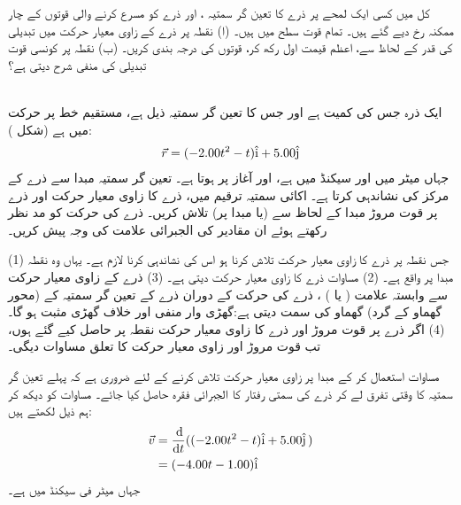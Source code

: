 کل  میں کسی ایک لمحے پر   ذرے کا تعین گر سمتیہ ، اور  ذرے کو مسرع کرنے والی قوتوں کے چار ممکنہ رخ دیے گئے ہیں۔ تمام قوت سطح  میں ہیں۔ (ا)  نقطہ  پر ذرے کے زاوی معیار حرکت میں تبدیلی   کی قدر  کے لحاظ سے، اعظم قیمت  اول رکھ کر،  قوتوں کی درجہ بندی کریں۔ (ب)  نقطہ  پر کونسی قوت  تبدیلی کی منفی شرح دیتی ہے؟

\\
ایک ذرہ جس کی کمیت     ہے اور جس کا تعین گر سمتیہ ذیل ہے، مستقیم خط پر حرکت میں ہے (شکل ):
\begin{align*}
\vec{r}=(-2.00t^2-t) \hat{\textup{i}}+5.00\hat{\textup{j}}
\end{align*}
جہاں  میٹر میں اور  سیکنڈ میں ہے، اور آغاز  پر ہوتا ہے۔ تعین گر سمتیہ مبدا سے ذرے  کے مرکز  کی نشاندہی کرتا ہے۔ اکائی سمتیہ ترقیم میں،  ذرے کا  زاوی معیار حرکت  اور  ذرے پر قوت مروڑ   مبدا کے لحاظ سے  (یا مبدا پر) تلاش کریں۔ ذرے کی حرکت کو مد نظر رکھتے ہوئے ان مقادیر کی الجبرائی علامت  کی وجہ پیش کریں۔

(1)  جس نقطہ پر ذرے کا زاوی معیار حرکت  تلاش کرنا ہو اس کی نشاندہی کرنا لازم ہے۔ یہاں وہ نقطہ مبدا پر واقع ہے۔ (2)   مساوات    ذرے کا زاوی معیار حرکت     دیتی ہے۔  (3)  ذرے کے زاوی معیار حرکت سے  وابستہ  علامت ( یا ) ، ذرے کی حرکت کے دوران ذرے کے تعین گر سمتیہ کے (محور گھماو کے گرد)   گھماو کی سمت دیتی ہے:گھڑی وار منفی اور خلاف گھڑی مثبت ہو گا۔ (4)  اگر ذرے پر قوت مروڑ اور ذرے کا  زاوی معیار حرکت  نقطہ  پر حاصل کیے گئے ہوں،  تب قوت مروڑ  اور زاوی معیار حرکت کا تعلق مساوات   
 دیگی۔

\quad
مساوات  استعمال کر کے مبدا پر زاوی معیار حرکت تلاش کرنے کے لئے ضروری ہے کہ پہلے  تعین گر سمتیہ کا وقتی تفرق لے کر ذرے کی سمتی رفتار  کا الجبرائی فقرہ حاصل کیا جائے۔ مساوات     کو دیکھ کر ہم ذیل لکھتے ہیں:
\begin{align*}
\vec{v}&=\frac{\dif}{\dif t}((-2.00t^2-t)\ihat+5.00\jhat\,)\\
&=(-4.00t-1.00)\ihat
\end{align*}
جہاں  میٹر فی سیکنڈ میں ہے۔

